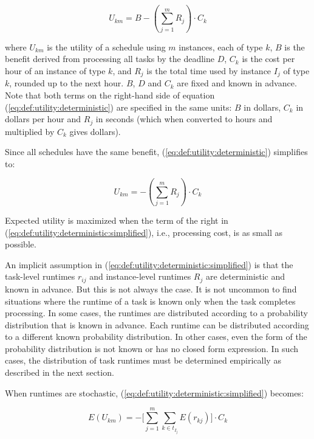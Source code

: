\documentclass[12pt]{report}
\begin{document}
\begin{equation}
\label{eq:def:utility:deterministic}
	U_{km} = B - \left(\sum_{j=1}^{m} R_{j} \right) \cdot C_k
\end{equation}

where $U_{km}$ is the utility of a schedule using $m$ instances, each of type $k$, $B$ is the benefit derived from processing all tasks by the deadline $D$, $C_k$ is the cost per hour of an instance of type $k$, and $R_j$ is the total time used by instance $I_j$ of type $k$, rounded up to the next hour.
$B$, $D$ and $C_k$ are fixed and known in advance.
Note that both terms on the right-hand side of equation (\ref{eq:def:utility:deterministic}) are specified in the same units: $B$ in dollars, $C_k$ in dollars per hour and $R_j$ in seconds (which when converted to hours and multiplied by $C_k$ gives dollars).

Since all schedules have the same benefit, (\ref{eq:def:utility:deterministic}) simplifies to:

\begin{equation}
\label{eq:def:utility:deterministic:simplified}
	U_{km} = - \left(\sum_{j=1}^{m} R_{j} \right) \cdot C_k
\end{equation}

Expected utility is maximized when the term of the right in  (\ref{eq:def:utility:deterministic:simplified}), i.e., processing cost, is as small as possible.

An implicit assumption in (\ref{eq:def:utility:deterministic:simplified}) is that the task-level runtimes $r_{ij}$ and instance-level runtimes $R_j$ are deterministic and known in advance.
But this is not always the case.
It is not uncommon to find situations where the runtime of a task is known only when the task completes processing.
In some cases, the runtimes are distributed according to a probability distribution that is known in advance.
Each runtime can be distributed according to a different known probability distribution.
In other cases, even the form of the probability distribution is not known or has no closed form expression.
In such cases, the distribution of task runtimes must be determined empirically as described in the next section.

When runtimes are stochastic, (\ref{eq:def:utility:deterministic:simplified}) becomes:

\begin{equation}
\label{eq:def:utility:stochastic}
	E(U_{km}) = - \bigg[\sum_{j=1}^{m} \sum_{k \in t_{I_j}} E(r_{kj}) \bigg] \cdot C_k
\end{equation}
\end{document}
